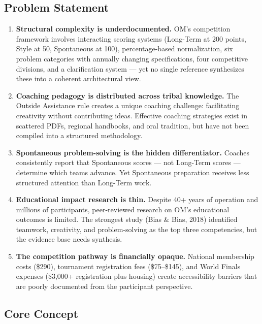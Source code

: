 \documentclass[11pt,letterpaper]{article}
\begin{document}
\subsection{Problem Statement}

\begin{enumerate}[leftmargin=2em]
\item \textbf{Structural complexity is underdocumented.} OM's competition framework involves interacting scoring systems (Long-Term at 200 points, Style at 50, Spontaneous at 100), percentage-based normalization, six problem categories with annually changing specifications, four competitive divisions, and a clarification system --- yet no single reference synthesizes these into a coherent architectural view.

\item \textbf{Coaching pedagogy is distributed across tribal knowledge.} The Outside Assistance rule creates a unique coaching challenge: facilitating creativity without contributing ideas. Effective coaching strategies exist in scattered PDFs, regional handbooks, and oral tradition, but have not been compiled into a structured methodology.

\item \textbf{Spontaneous problem-solving is the hidden differentiator.} Coaches consistently report that Spontaneous scores --- not Long-Term scores --- determine which teams advance. Yet Spontaneous preparation receives less structured attention than Long-Term work.

\item \textbf{Educational impact research is thin.} Despite 40+ years of operation and millions of participants, peer-reviewed research on OM's educational outcomes is limited. The strongest study (Bias \& Bias, 2018) identified teamwork, creativity, and problem-solving as the top three competencies, but the evidence base needs synthesis.

\item \textbf{The competition pathway is financially opaque.} National membership costs (\$290), tournament registration fees (\$75--\$145), and World Finals expenses (\$3,000+ registration plus housing) create accessibility barriers that are poorly documented from the participant perspective.
\end{enumerate}

\subsection{Core Concept}
\end{document}
